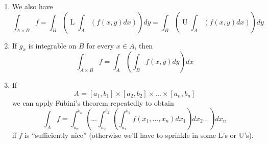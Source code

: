 \documentclass{article}
\newcommand{\loint}[0]{\operatorname{L}\int}
\newcommand{\hiint}[0]{\operatorname{U}\int}
\begin{document}
\begin{enumerate}

  \item We also have
  \begin{equation}
    \int_{A \times B}f = \int_B\left(\loint_A(f(x, y)dx)\right)dy = \int_B\left(\hiint_A(f(x, y)dx)\right)dy
  \end{equation}

  \item If \(g_x\) is integrable on \(B\) for every \(x \in A\), then
  \begin{equation}
    \int_{A \times B}f = \int_A\left(\int_Bf(x, y)dy\right)dx
  \end{equation}

  \item If
  \begin{equation}
    A = [a_1, b_1] \times [a_2, b_2] \times ... \times [a_n, b_n]
  \end{equation}
  we can apply Fubini's theorem repeatedly to obtain
  \begin{equation}
    \int_Af = \int_{a_n}^{b_n} \left(... \int_{a_2}^{b_2}\left(\int_{a_1}^{b_1}f(x_1,...,x_n)dx_1\right)dx_2...\right) dx_n
  \end{equation}
  if \(f\) is ``sufficiently nice'' (otherwise we'll have to sprinkle in some L's or U's).

\end{enumerate}
\end{document}
